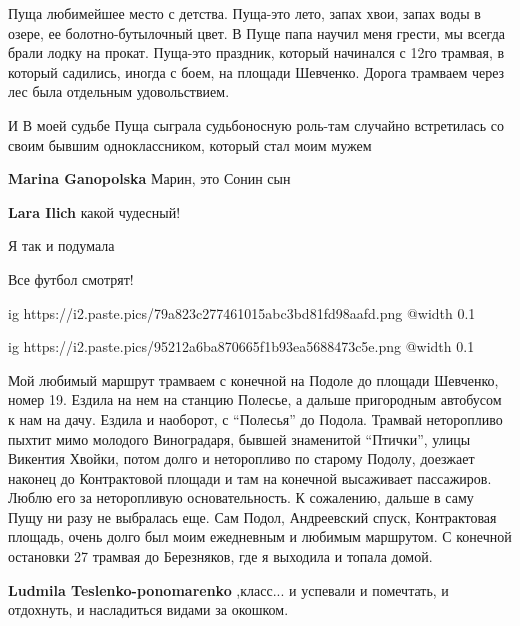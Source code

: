 \begin{itemize}
\begin{itemize}

Пуща любимейшее место с детства. Пуща-это лето, запах хвои, запах воды в озере, ее
болотно-бутылочный цвет. В Пуще папа научил меня грести, мы всегда брали лодку на
прокат. Пуща-это праздник, который начинался с 12го трамвая, в который
садились, иногда с боем, на площади Шевченко. Дорога трамваем через лес была
отдельным удовольствием.

И В моей судьбе Пуща сыграла судьбоносную роль-там случайно встретилась со
своим бывшим одноклассником, который стал моим мужем

\begin{itemize} %
\textbf{Marina Ganopolska} Марин, это Сонин сын

\textbf{Lara Ilich} какой чудесный!

Я так и подумала
\end{itemize} %

\end{itemize} %

Все футбол смотрят!

\ifcmt
  ig https://i2.paste.pics/79a823c277461015abc3bd81fd98aafd.png
  @width 0.1
\fi


\ifcmt
  ig https://i2.paste.pics/95212a6ba870665f1b93ea5688473c5e.png
  @width 0.1
\fi


Мой любимый маршрут трамваем с конечной на Подоле до площади Шевченко, номер
19. Ездила на нем на станцию Полесье, а дальше пригородным автобусом к нам на
дачу. Ездила и наоборот, с \enquote{Полесья} до Подола. Трамвай неторопливо пыхтит мимо
молодого Виноградаря, бывшей знаменитой \enquote{Птички}, улицы Викентия Хвойки, потом
долго и неторопливо по старому Подолу, доезжает наконец до Контрактовой площади
и там на конечной высаживает пассажиров. Люблю его за неторопливую
основательность. К сожалению, дальше в саму Пущу ни разу не выбралась еще. Сам
Подол, Андреевский спуск, Контрактовая площадь, очень долго был моим ежедневным
и любимым маршрутом. С конечной остановки 27 трамвая до Березняков, где я
выходила и топала домой.

\begin{itemize} %
\textbf{Ludmila Teslenko-ponomarenko} ,класс... и успевали и помечтать, и отдохнуть, и насладиться видами за окошком.


\end{itemize}
\end{itemize}
